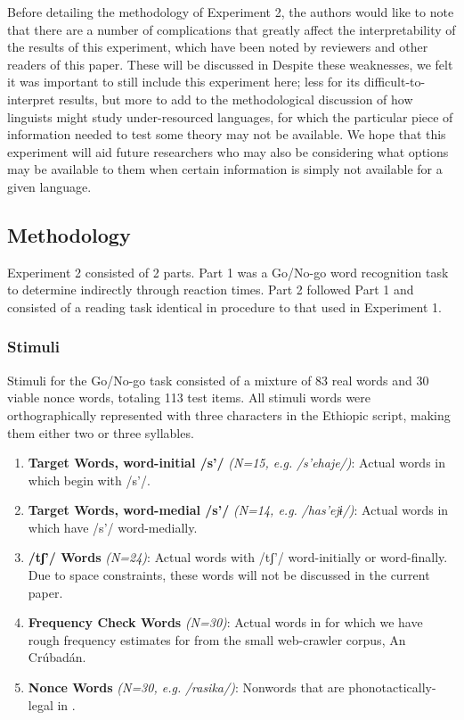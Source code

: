 \documentclass[output=paper
,newtxmath
,modfonts
,nonflat]{langsci/langscibook}
\begin{document}
Before detailing the methodology of Experiment 2, the authors would like to note that there are a number of complications that greatly affect the interpretability of the results of this experiment, which have been noted by reviewers and other readers of this paper. These will be discussed in  Despite these weaknesses, we felt it was important to still include this experiment here; less for its difficult-to-interpret results, but more to add to the methodological discussion of how linguists might study under-resourced languages, for which the particular piece of information needed to test some theory may not be available. We hope that this experiment will aid future researchers who may also be considering what options may be available to them when certain information is simply not available for a given language.

\subsection{Methodology}\label{sec:moeng:6.1}

Experiment 2 consisted of 2 parts. Part 1 was a Go/No-go word recognition task to determine  indirectly through reaction times. Part 2 followed Part 1 and consisted of a reading task identical in procedure to that used in Experiment 1.

\pagebreak

\subsubsection{Stimuli}\label{sec:moeng:6.1.1}

Stimuli for the Go/No-go task consisted of a mixture of 83 real  words and 30 viable nonce words, totaling 113 test items. All stimuli words were orthographically represented with three characters in the Ethiopic script, making them either two or three syllables. 

\begin{enumerate}
\item {\textbf{Target Words, word-initial /s’/} \textit{(N=15, e.g.}  \textit{/s’ehaje/)}: Actual words in  which begin with /s’/.}
\item {\textbf{Target Words, word-medial /s’/} \textit{(N=14, e.g.}  \textit{/has’ejɨ}\textit{/)}: Actual words in  which have /s’/ word-medially.}
\item {\textbf{/tʃ’/ Words} \textit{(N=24)}: Actual words with /tʃ’/ word-initially or word-finally. Due to space constraints, these words will not be discussed in the current paper.}
\item {\textbf{Frequency Check Words} \textit{(N=30)}: Actual words in  for which we have rough frequency estimates for from the small web-crawler corpus, An Crúbadán.}
\item {\textbf{Nonce Words} \textit{(N=30, e.g.}  \textit{/rasika/)}: Nonwords that are phonotactically-legal in .} 
\end{enumerate}
\end{document}

